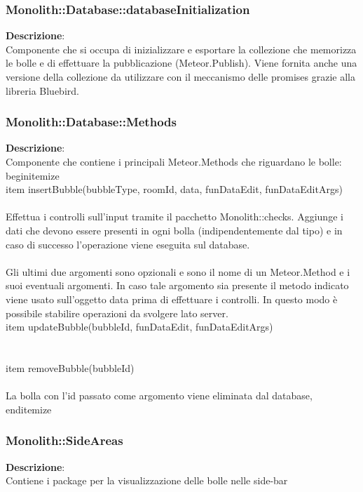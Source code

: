 \clearpage

\subsubsection{Monolith::Database::databaseInitialization}
\textbf{Descrizione}:\\
 Componente che si occupa di inizializzare e esportare la collezione che memorizza le bolle e di effettuare la pubblicazione (Meteor.Publish). Viene fornita anche una versione della collezione da utilizzare con il meccanismo delle promises grazie alla libreria Bluebird. 


\clearpage

\subsubsection{Monolith::Database::Methods}
\textbf{Descrizione}:\\
 Componente che contiene i principali Meteor.Methods  che riguardano le bolle:
\\begin{itemize}
\\item insertBubble(bubbleType, roomId, data, funDataEdit, funDataEditArgs) \\\\
Effettua i controlli sull'input tramite il pacchetto Monolith::checks. Aggiunge i dati che devono essere presenti in ogni bolla (indipendentemente dal tipo) e in caso di successo l'operazione viene eseguita sul database.\\\\
Gli ultimi due argomenti sono opzionali e sono il nome di un Meteor.Method e i suoi eventuali argomenti. In caso tale argomento sia presente il metodo indicato viene usato sull'oggetto data prima di effettuare i controlli. In questo modo è possibile stabilire operazioni da svolgere lato server.
\\item updateBubble(bubbleId, funDataEdit, funDataEditArgs)\\\\
\\item removeBubble(bubbleId) \\\\
La bolla con l'id passato come argomento viene eliminata dal database,
\\end{itemize} 


\clearpage

\subsubsection{Monolith::SideAreas}
\textbf{Descrizione}:\\
 Contiene i package per la visualizzazione delle bolle nelle side-bar 


